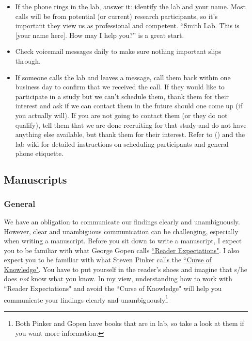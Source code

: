 \documentclass[letterpaper,12pt,oneside]{memoir}
\begin{document}
\begin{itemize}
\item If the phone rings in the lab, answer it: identify the lab and your name. Most calls will be from potential (or current) research participants, so it's important they view us as professional and competent. ``Smith Lab. This is [your name here]. How may I help you?'' is a great start. 

\item Check voicemail messages daily to make sure nothing important slips through.

\item If someone calls the lab and leaves a message, call them back within one business day to confirm that we received the call. If they would like to participate in a study but we can't schedule them, thank them for their interest and ask if we can contact them in the future should one come up (if you actually will). If you are not going to contact them (or they do not qualify), tell them that we are done recruiting for that study and do not have anything else available, but thank them for their interest. Refer to  () and the lab wiki for detailed instructions on scheduling participants and general phone etiquette.

\end{itemize}



\subsection{Manuscripts}

\subsubsection{General}

We have an obligation to communicate our findings clearly and unambiguously. However, clear and unambiguous communication can be challenging, especially when writing a manuscript. Before you sit down to write a manuscript, I expect you to be familiar with what George Gopen calls \href{https://cseweb.ucsd.edu/~swanson/papers/science-of-writing.pdf}{``Reader Expectations"}. I also expect you to be familiar with what Steven Pinker calls the \href{https://stevenpinker.com/files/pinker/files/why_academics_stink_at_writing.pdf}{``Curse of Knowledge"}. You have to put yourself in the reader's shoes and imagine that s/he does \textit{not} know what you know. In my view, understanding how to work with ``Reader Expectations" and avoid the ``Curse of Knowledge" will help you communicate your findings clearly and unambiguously\footnote{Both Pinker and Gopen have books that are in lab, so take a look at them if you want more information.}
\end{document}
